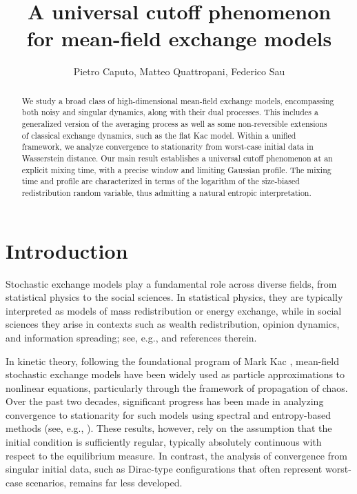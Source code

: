 \documentclass[11pt,reqno]{amsart}
\author{Pietro Caputo, Matteo Quattropani, Federico Sau}
\theoremstyle{remark}
\theoremstyle{definition}
\numberwithin{equation}{section}
\numberwithin{figure}{section}
\begin{document}
		  	\title[A universal cutoff phenomenon for 
		  	mean-field
		  	exchange models]{A universal cutoff phenomenon\\ for 
		  	mean-field
		  	exchange models}
	
\begin{abstract} 
We study a broad class of high-dimensional mean-field exchange models, encompassing both noisy and singular dynamics, along with their dual processes. This includes a generalized version of the averaging process as well as some non-reversible extensions of classical exchange dynamics, such as the flat Kac model. Within a unified framework, we analyze convergence to stationarity from worst-case initial data in Wasserstein distance. Our main result establishes a universal cutoff phenomenon at an explicit mixing time, with a precise window and limiting Gaussian profile. The mixing time and profile are  characterized in terms of the logarithm of the size-biased redistribution random variable, thus admitting a natural entropic interpretation. 
\end{abstract}
	
	\maketitle
	
	\thispagestyle{empty}
	

		\section{Introduction}
		Stochastic exchange models play a fundamental role across diverse fields, from statistical physics to the social sciences. In statistical physics, they are typically interpreted as models of mass redistribution or energy exchange, while in social sciences they arise in contexts such as wealth redistribution, opinion dynamics, and information spreading; see, e.g., \cite{kipnis_heat_1982,castellano_statistical_2009,lanchier_stochastic_2024} and references therein. 
		
In kinetic theory, following the foundational program of Mark Kac \cite{kac_foundations_1956}, mean-field stochastic exchange models have been widely used as particle approximations to nonlinear equations, particularly through the framework of propagation of chaos. Over the past two decades, significant progress has been made in analyzing convergence to stationarity for such models using spectral and entropy-based methods (see, e.g., \cite{carlen_carvalho_loss_determination_2003, villani_cercignani_2003, carlen_entropy_2010, mischler_mouhot_kac_2013}). These results, however, rely on the assumption that the initial condition is sufficiently regular, typically absolutely continuous with respect to the equilibrium measure. In contrast, the analysis of convergence from singular initial data, such as Dirac-type configurations that often represent worst-case scenarios, remains far less developed.
\end{document}
